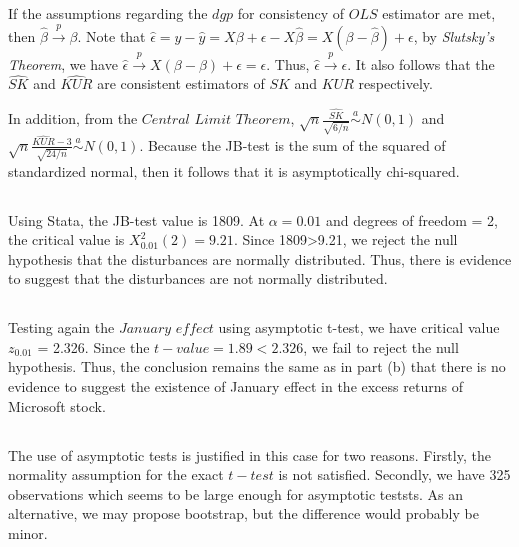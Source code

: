 \subsection{}
If the assumptions regarding the $dgp$  for consistency of $OLS$ estimator are met, then $\hat{\beta} \overset{p}{\rightarrow} \beta$. Note that $\hat{\epsilon} = y - \hat{y} =  X\beta + \epsilon - X\hat{\beta} = X(\beta - \hat{\beta}) + \epsilon$, by \textit{Slutsky's Theorem}, we have  $\hat{\epsilon} \overset{p}{\rightarrow} X(\beta - \beta) + \epsilon = \epsilon$. Thus, $\hat{\epsilon} \overset{p}{\rightarrow} \epsilon$. It also follows that the $\hat{SK}$ and $\hat{KUR}$ are consistent estimators of $SK$ and $KUR$ respectively.

\bigskip
\noindent
In addition, from the $Central$ $Limit$ $Theorem$, $\sqrt{n}\frac{\hat{SK}}{\sqrt{6/n}} \overset{a}{\sim} N(0,1)$ and $\sqrt{n}\frac{\hat{KUR} - 3}{\sqrt{24/n}} \overset{a}{\sim} N(0,1)$. Because the JB-test is the sum of the squared of standardized normal, then it follows that it is asymptotically chi-squared. 

\subsection{}

Using Stata, the JB-test value is 1809. At $\alpha=0.01$ and degrees of freedom  = 2, the critical value is $X^2_{0.01}(2) = 9.21$. Since 1809>9.21, we reject the null hypothesis that the disturbances are normally distributed. Thus, there is evidence to suggest that the disturbances are not normally distributed.

\subsection{}
Testing again the $January$ $effect$ using asymptotic t-test, we have critical value  $z_{0.01}$ = 2.326. Since the $t-value = 1.89 < 2.326$, we fail to reject the null hypothesis. Thus, the conclusion remains the same as in part (b) that there is no evidence to suggest the existence of January effect in the excess returns of Microsoft stock. 

\subsection{}
The use of asymptotic tests is justified in this case for two reasons. Firstly, the normality assumption for the exact $t-test$ is not satisfied. Secondly, we have 325 observations which seems to be large enough for asymptotic teststs. As an alternative, we may propose bootstrap, but the difference would probably be minor. 

